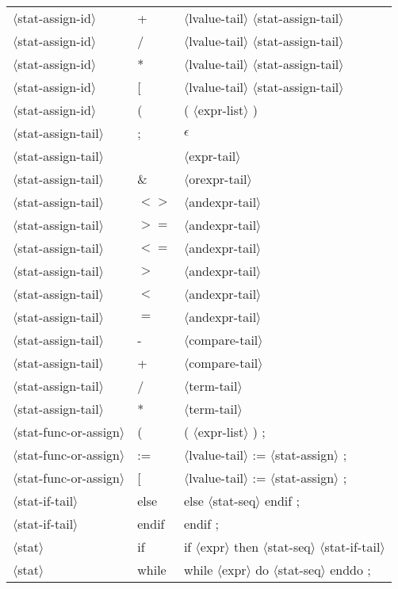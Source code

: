 \documentclass[11pt, fleqn]{article}
\newcommand{\atag}[1]{$\langle$#1$\rangle$}
\begin{document}
\begin{longtable}{l|l|l}
\atag{stat-assign-id}			&	+			&	\atag{lvalue-tail} \atag{stat-assign-tail}			\\
\atag{stat-assign-id}			&	/			&	\atag{lvalue-tail} \atag{stat-assign-tail}			\\
\atag{stat-assign-id}			&	*			&	\atag{lvalue-tail} \atag{stat-assign-tail}			\\
\atag{stat-assign-id}			&	[			&	\atag{lvalue-tail} \atag{stat-assign-tail}			\\
\atag{stat-assign-id}			&	(			&	( \atag{expr-list} )			\\
\atag{stat-assign-tail}			&	;			&	$\epsilon$	\\
\atag{stat-assign-tail}			&	\textbar		&	\atag{expr-tail}	\\
\atag{stat-assign-tail}			&	\&			&	\atag{orexpr-tail}	\\
\atag{stat-assign-tail}			&	$<>$			&	\atag{andexpr-tail}	\\
\atag{stat-assign-tail}			&	$>=$			&	\atag{andexpr-tail}	\\
\atag{stat-assign-tail}			&	$<=$			&	\atag{andexpr-tail}	\\
\atag{stat-assign-tail}			&	$>$			&	\atag{andexpr-tail}	\\
\atag{stat-assign-tail}			&	$<$			&	\atag{andexpr-tail}	\\
\atag{stat-assign-tail}			&	$=$			&	\atag{andexpr-tail}	\\
\atag{stat-assign-tail}			&	-			&	\atag{compare-tail}	\\
\atag{stat-assign-tail}			&	+			&	\atag{compare-tail}	\\
\atag{stat-assign-tail}			&	/			&	\atag{term-tail}	\\
\atag{stat-assign-tail}			&	*			&	\atag{term-tail}	\\
\atag{stat-func-or-assign}		&	(		&	( \atag{expr-list} ) ;	\\
\atag{stat-func-or-assign}		&	:=		&	\atag{lvalue-tail} := \atag{stat-assign}	;	\\
\atag{stat-func-or-assign}		&	[		&	\atag{lvalue-tail} := \atag{stat-assign}	;	\\
\atag{stat-if-tail}				&	else		&	else \atag{stat-seq} endif ;	\\
\atag{stat-if-tail}				&	endif	&	endif ;	\\
\atag{stat}						&	if		&	if \atag{expr} then \atag{stat-seq} \atag{stat-if-tail}		\\
\atag{stat}						&	while	&	while \atag{expr} do \atag{stat-seq} enddo ;		\\

\end{longtable}
\end{document}
